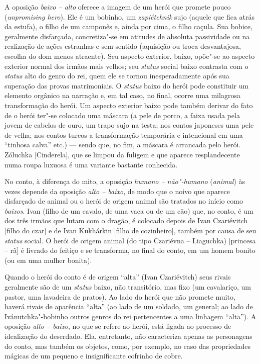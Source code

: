 A oposição \emph{baixo -- alto} oferece a imagem de um herói que promete pouco
(\emph{unpromising hero}). Ele é um bobinho, um \emph{zapiétchnik} sujo
(aquele que fica atrás da estufa), o filho de um camponês e, ainda por
cima, o filho caçula. Sua bobice, geralmente disfarçada, concretiza"-se
em atitudes de absoluta passividade ou na realização de ações estranhas
e sem sentido (aquisição ou troca desvantajosa, escolha do dom menos
atraente). Seu aspecto exterior, baixo, opõe"-se ao aspecto exterior
normal dos irmãos mais velhos; seu \emph{status} social baixo contrasta com
o \emph{status} alto do genro do rei, quem ele se tornou inesperadamente após
sua superação das provas matrimoniais. O \emph{status} baixo do herói pode
constituir um elemento orgânico na narração e, em tal caso, no final,
ocorre uma milagrosa transformação do herói. Um aspecto exterior baixo
pode também derivar do fato de o herói ter"-se colocado uma máscara (a
pele de porco, a faixa usada pela jovem de cabelos de ouro, um trapo
sujo na testa; nos contos japoneses uma pele de velha; nos contos turcos
a transformação temporária e intencional em uma ``tinhosa calva'' etc.)
--- sendo que, no fim, a máscara é arrancada pelo herói. Zóluchka
[Cinderela], que se limpou da fuligem e que aparece resplandecente
numa roupa luxuosa é uma variante bastante conhecida.

No conto, à diferença do mito, a oposição \emph{humano --
não"-humano} (\emph{animal}) às vezes depende da oposição \emph{alto -- baixo}, de
modo que o noivo que aparece disfarçado de animal ou o herói de origem
animal são tratados no início como \emph{baixos}. Ivan (filho de um cavalo,
de uma vaca ou de um cão) que, no conto, é um dos três irmãos que lutam
com o dragão, é colocado depois de Ivan Czariévitch [filho do czar]
e de Ivan Kukhárkin [filho de cozinheiro], também por causa de
seu \emph{status} social. O herói de origem animal (do tipo Czariévna --
Liaguchka) [princesa -- rã] é livrado do feitiço e se transforma, no
final do conto, em um homem bonito (ou em uma mulher bonita).

Quando o herói do conto é de origem ``alta'' (Ivan Czariévitch) seus
rivais geralmente são de um \emph{status} baixo, não transitório, mas fixo
(um cavalariço, um pastor, uma lavadeira de pratos). Ao lado do herói
que não promete muito, haverá rivais de aparência ``alta'' (ao lado de
um soldado, um general; ao lado de Ivánutchka"-bobinho outros genros do
rei pertencentes a uma linhagem ``alta''). A oposição \emph{alto -- baixo}, no
que se refere ao herói, está ligada ao processo de idealização do
deserdado. Ela, entretanto, não caracteriza apenas as personagens do
conto, mas também os objetos, como, por exemplo, no caso das
propriedades mágicas de um pequeno e insignificante cofrinho de cobre.


